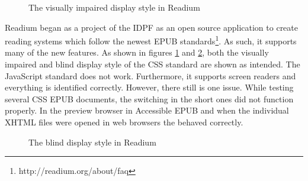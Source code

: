 \begin{figure}[H]
	\centering
	\caption{The visually impaired display style in Readium}
	\label{fig:ReadiumVi}
\end{figure}
Readium began as a project of the IDPF as an open source application to create reading systems which follow the newest EPUB standards\footnote{http://readium.org/about/faq}. As such, it supports many of the new features. As shown in figures \ref{fig:ReadiumVi} and \ref{fig:ReadiumBl}, both the visually impaired and blind display style of the CSS standard are shown as intended. The JavaScript standard does not work. Furthermore, it supports screen readers and everything is identified correctly. However, there still is one issue. While testing several CSS EPUB documents, the switching in the short ones did not function properly. In the preview browser in Accessible EPUB and when the individual XHTML files were opened in web browsers the behaved correctly.


\begin{figure}[H]
	\centering
	\caption{The blind display style in Readium}
	\label{fig:ReadiumBl}
\end{figure}


